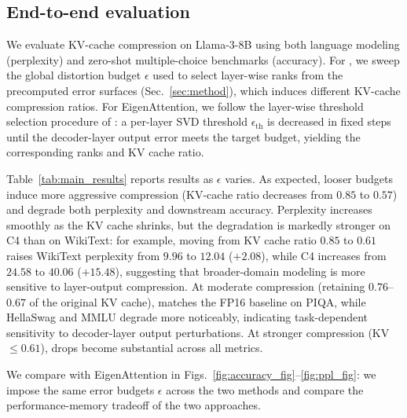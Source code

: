 \subsection{End-to-end evaluation}
\label{sec:results_e2e}
%

We evaluate KV-cache compression on Llama-3-8B using both language modeling (perplexity) and zero-shot multiple-choice benchmarks (accuracy). For \methodname, we sweep the global distortion budget $\epsilon$ used to select layer-wise ranks from the precomputed error surfaces (Sec.~\ref{sec:method}), which induces different KV-cache compression ratios. 
For EigenAttention, we follow the layer-wise threshold selection procedure of \citet{saxena2024eigenattention}: a per-layer SVD threshold $\epsilon_{\mathrm{th}}$ is decreased in fixed steps until the decoder-layer output error meets the target budget, yielding the corresponding ranks and KV cache ratio.

Table~\ref{tab:main_results} reports \methodname results as $\epsilon$ varies. 
As expected, looser budgets induce more aggressive compression (KV-cache ratio decreases from $0.85$ to $0.57$) and degrade both perplexity and downstream accuracy.
Perplexity increases smoothly as the KV cache shrinks, but the degradation is markedly stronger on C4 than on WikiText: for example, moving from KV cache ratio $0.85$ to $0.61$ raises WikiText perplexity from $9.96$ to $12.04$ ($+2.08$), while C4 increases from $24.58$ to $40.06$ ($+15.48$), suggesting that broader-domain modeling is more sensitive to layer-output compression. 
At moderate compression (retaining $0.76$--$0.67$ of the original KV cache), \methodname matches the FP16 baseline on PIQA, while HellaSwag and MMLU degrade more noticeably, indicating task-dependent sensitivity to decoder-layer output perturbations.
At stronger compression (KV$\le 0.61$), drops become substantial across all metrics.



We compare \methodname with EigenAttention in Figs.~\ref{fig:accuracy_fig}--\ref{fig:ppl_fig}: we impose the same error budgets $\epsilon$ across the two methods and compare the performance-memory tradeoff of the two approaches.

